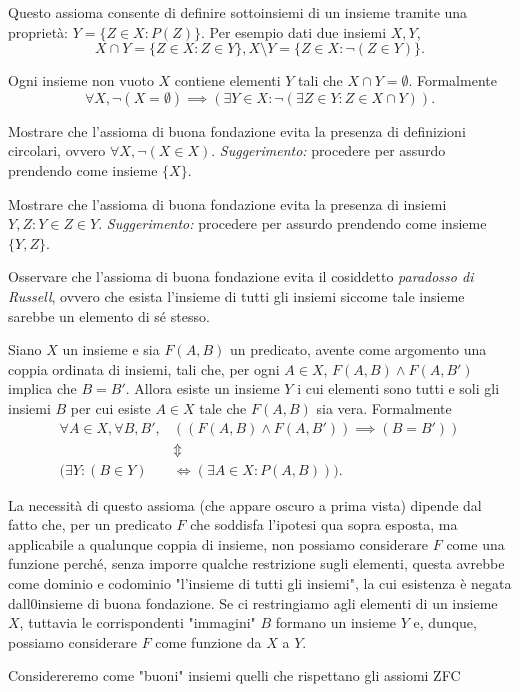 \documentclass[12pt, twoside, italian, openany]{book}
\begin{document}
    Questo assioma consente di definire sottoinsiemi di un insieme tramite una proprietà: $Y = \{ Z \in X: P(Z)\}$. Per esempio dati due insiemi $X, Y$,
    $$
    X \cap Y = \{ Z \in X: Z \in Y \}, X \setminus Y = \{ Z \in X: \lnot(Z \in Y) \}.
    $$
    \begin{axiom}
        Ogni insieme non vuoto $X$ contiene elementi $Y$ tali che $X \cap Y = \emptyset$. Formalmente
        $$
        \forall X, \lnot(X = \emptyset) \implies (\exists Y \in X: \lnot(\exists Z \in Y: Z \in X \cap Y)). 
        $$
    \end{axiom}
    \begin{exercise}
        Mostrare che l'assioma di buona fondazione evita la presenza di definizioni circolari, ovvero $\forall X, \lnot(X \in X)$. \emph{Suggerimento:} procedere per assurdo prendendo come insieme $\{ X \}$.
    \end{exercise}
    \begin{exercise}
        Mostrare che l'assioma di buona fondazione evita la presenza di insiemi $Y, Z : Y \in Z \in Y$. \emph{Suggerimento:} procedere per assurdo prendendo come insieme $\{ Y, Z \}$.
    \end{exercise}
    \begin{remark}
    Osservare che l'assioma di buona fondazione evita il cosiddetto \emph{paradosso di Russell}, ovvero che esista l'insieme di tutti gli insiemi siccome tale insieme sarebbe un elemento di sé stesso.
    \end{remark}
    \begin{axiom}[di rimpiazzamento]
        Siano $X$ un insieme e sia $F(A, B)$ un predicato, avente come argomento una coppia ordinata di insiemi, tali che, per ogni $A \in X$, $F(A, B) \wedge F(A, B')$ implica che $B = B'$. Allora esiste un insieme $Y$ i cui elementi sono tutti e soli gli insiemi $B$ per cui esiste $A \in X$ tale che $F(A, B)$ sia vera. Formalmente
        \begin{align*}
        \forall A \in X, \forall B, B', &((F(A, B) \wedge F(A, B')) \implies (B=B')) \\
        &\Updownarrow \\
        (\exists Y : (B \in Y) &\iff (\exists A \in X: P(A, B))).
        \end{align*}
    \end{axiom}
    La necessità di questo assioma (che appare oscuro a prima vista) dipende dal fatto che, per un predicato $F$ che soddisfa l'ipotesi qua sopra esposta, ma applicabile a qualunque coppia di insieme, non possiamo considerare $F$ come una funzione perché, senza imporre qualche restrizione sugli elementi, questa avrebbe come dominio e codominio "l'insieme di tutti gli insiemi", la cui esistenza è
    negata dall0insieme di buona fondazione. Se ci restringiamo agli elementi di un insieme $X$, tuttavia le corrispondenti "immagini" $B$ formano un insieme $Y$ e, dunque, possiamo considerare $F$ come funzione da $X$ a $Y$. \\
    \begin{remark}
        Considereremo come "buoni" insiemi quelli che rispettano gli assiomi ZFC
    \end{remark}
\end{document}
